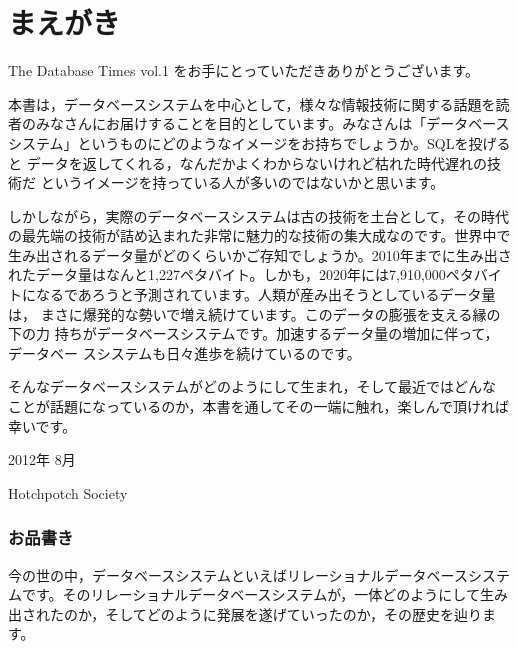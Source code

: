 
\chapter*{まえがき}
\thispagestyle{plainhead}

The Database Times vol.1 をお手にとっていただきありがとうございます。

本書は，データベースシステムを中心として，様々な情報技術に関する話題を読
者のみなさんにお届けすることを目的としています。みなさんは「データベース
システム」というものにどのようなイメージをお持ちでしょうか。SQLを投げると
データを返してくれる，なんだかよくわからないけれど枯れた時代遅れの技術だ
というイメージを持っている人が多いのではないかと思います。

しかしながら，実際のデータベースシステムは古の技術を土台として，その時代
の最先端の技術が詰め込まれた非常に魅力的な技術の集大成なのです。世界中で
生み出されるデータ量がどのくらいかご存知でしょうか。2010年までに生み出さ
れたデータ量はなんと1,227ペタバイト。しかも，2020年には7,910,000ペタバイ
トになるであろうと予測されています。人類が産み出そうとしているデータ量は，
まさに爆発的な勢いで増え続けています。このデータの膨張を支える縁の下の力
持ちがデータベースシステムです。加速するデータ量の増加に伴って，データベー
スシステムも日々進歩を続けているのです。

そんなデータベースシステムがどのようにして生まれ，そして最近ではどんな
ことが話題になっているのか，本書を通してその一端に触れ，楽しんで頂ければ
幸いです。

\begin{flushright}
 2012年 8月

Hotchpotch Society
\end{flushright}

\newpage

\subsection*{お品書き}


今の世の中，データベースシステムといえばリレーショナルデータベースシステ
ムです。そのリレーショナルデータベースシステムが，一体どのようにして生み
出されたのか，そしてどのように発展を遂げていったのか，その歴史を辿ります。

\vspace*{\Cvs}


